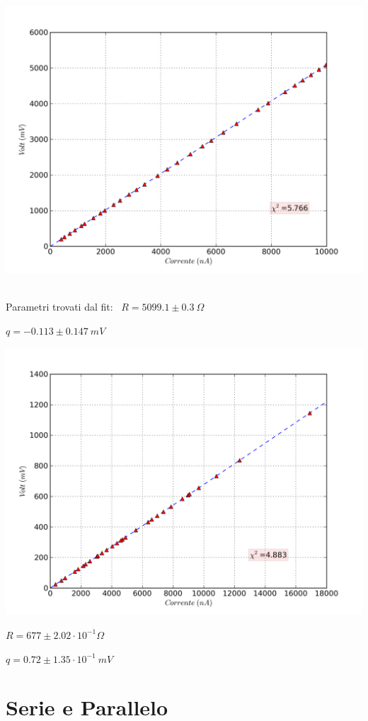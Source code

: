 \includegraphics[scale=0.75]{grafici/C1/res1.png}
\

Parametri trovati dal fit: \
$R= 5099.1 \pm 0.3 \ \Omega$

$q = -0.113 \pm 0.147\ mV$


\includegraphics[scale=0.75]{grafici/C1/res2.png}

$R = 677 \pm 2.02\cdot 10^{-1} \Omega$

$q = 0.72 \pm 1.35\cdot 10^{-1} \ mV $
\

\section{Serie e Parallelo}

